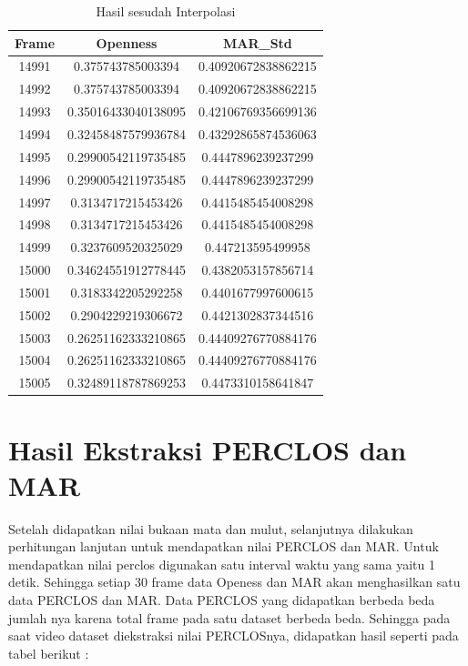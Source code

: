 \begin{longtable}{|c|c|c|}
  \caption{Hasil sesudah Interpolasi}
  \label{tb:InterpolasiHasil}                                   \\
  \hline
  \rowcolor[HTML]{C0C0C0}
  \textbf{Frame} & \textbf{Openness} & \textbf{MAR\_Std} \\
  \hline
  14991 & 0.375743785003394 & 0.40920672838862215 \\
  14992 & 0.375743785003394 & 0.40920672838862215 \\
  14993 & 0.35016433040138095 & 0.42106769356699136 \\
  14994 & 0.32458487579936784 & 0.43292865874536063 \\
  14995 & 0.29900542119735485 & 0.4447896239237299 \\
  14996 & 0.29900542119735485 & 0.4447896239237299 \\
  14997 & 0.3134717215453426 & 0.4415485454008298 \\
  14998 & 0.3134717215453426 & 0.4415485454008298 \\
  14999 & 0.3237609520325029 & 0.447213595499958 \\
  15000 & 0.34624551912778445 & 0.4382053157856714 \\
  15001 & 0.3183342205292258 & 0.4401677997600615 \\
  15002 & 0.2904229219306672 & 0.4421302837344516 \\
  15003 & 0.26251162333210865 & 0.44409276770884176 \\
  15004 & 0.26251162333210865 & 0.44409276770884176 \\
  15005 & 0.32489118787869253 & 0.4473310158641847 \\
  \hline
\end{longtable}



\section{Hasil Ekstraksi PERCLOS dan MAR}
\label{sec:PERCLOSMAR}
Setelah didapatkan nilai bukaan mata dan mulut, selanjutnya dilakukan perhitungan lanjutan untuk mendapatkan nilai PERCLOS dan MAR. Untuk mendapatkan nilai perclos digunakan satu interval waktu yang sama yaitu 1 detik. Sehingga setiap 30 frame data Openess dan MAR akan menghasilkan satu data PERCLOS dan MAR. Data PERCLOS yang didapatkan berbeda beda jumlah nya karena total frame pada satu dataset berbeda beda. Sehingga pada saat video dataset diekstraksi nilai PERCLOSnya, didapatkan hasil seperti pada tabel berikut :

